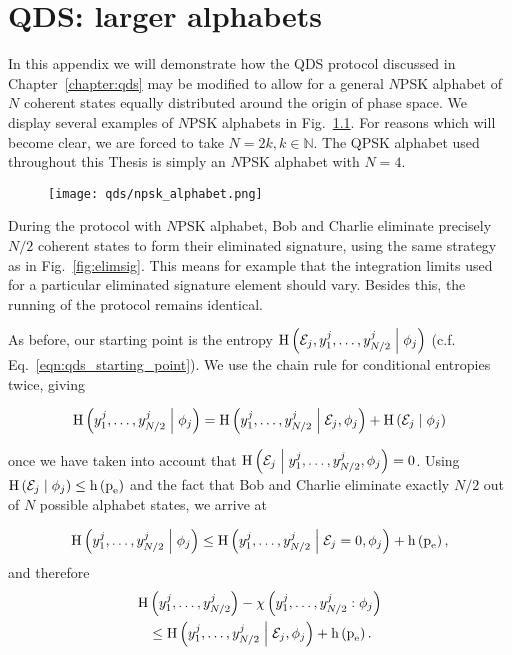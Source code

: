 \chapter{QDS: larger alphabets}\label{appendix:qds_larger_alphabets}

In this appendix we will demonstrate how the QDS protocol discussed in Chapter~\ref{chapter:qds} may be modified to allow for a general $N$PSK alphabet of $N$ coherent states equally distributed around the origin of phase space. We display several examples of $N$PSK alphabets in Fig.~\ref{fig:appendix_npsk}. For reasons which will become clear, we are forced to take $N = 2 k, k \in \mathbb{N}$. The QPSK alphabet used throughout this Thesis is simply an $N$PSK alphabet with $N=4$.

\begin{figure}[htp]
\captionsetup{width=0.8\linewidth}
\centering
\texttt{[image: qds/npsk\_alphabet.png]}
\caption{\label{fig:appendix_npsk} }
\end{figure}

During the protocol with $N$PSK alphabet, Bob and Charlie eliminate precisely $N/2$ coherent states to form their eliminated signature, using the same strategy as in Fig.~\ref{fig:elimsig}. This means for example that the integration limits used for a particular eliminated signature element should vary. Besides this, the running of the protocol remains identical.

As before, our starting point is the entropy $\text{H}\left( \mathcal{E}_j, y_1^j, \dots, y_{N/2}^j \; \middle| \; \phi_j \right)$ (c.f. Eq.~\ref{eqn:qds_starting_point}). We use the chain rule for conditional entropies twice, giving

\begin{equation}
\text{H}\left(y_1^j, \dots, y_{N/2}^j \; \middle| \; \phi_j\right) = \text{H}\left(y_1^j, \dots, y_{N/2}^j \; \middle| \; \mathcal{E}_j, \phi_j \right) + \text{H}\left(\mathcal{E}_j \; \middle| \; \phi_j\right)
\end{equation}

\noindent once we have taken into account that $\text{H}\left(\mathcal{E}_j \; \middle| \; y_1^j, \dots, y_{N/2}^j, \phi_j \right)=0$. Using $\text{H}\left(\mathcal{E}_j \; \middle| \; \phi_j \right) \le \text{h}\left(\text{p}_{\text{e}}\right)$ and the fact that Bob and Charlie eliminate exactly $N/2$ out of $N$ possible alphabet states, we arrive at

\begin{equation}
\text{H}\left(y_1^j, \dots, y_{N/2}^j \; \middle| \; \phi_j\right) \le \text{H}\left(y_1^j, \dots, y_{N/2}^j\; \middle| \; \mathcal{E}_j = 0, \phi_j\right) + \text{h}\left(\text{p}_{\text{e}}\right),
\end{equation}
and therefore
\begin{align}
\text{H}&\left(y_1^j, \dots, y_{N/2}^j\right) - \chi\left(y_1^j, \dots, y_{N/2}^j : \phi_j\right) \notag \\
%
& \le \text{H}\left(y_1^j, \dots, y_{N/2}^j \given \mathcal{E}_j, \phi_j\right) + \text{h}\left(\pe\right).
\end{align}

